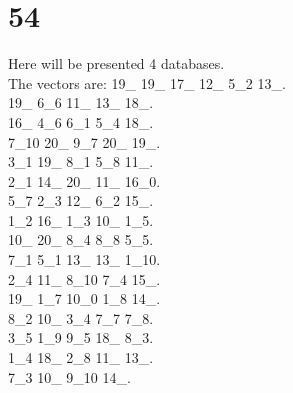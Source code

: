 \chapter{54}
\indent Here will be presented 4 databases.\\
The vectors are:
19\_ 19\_ 17\_ 12\_ 5\_2 13\_.\\19\_ 6\_6 11\_ 13\_ 18\_.\\16\_ 4\_6 6\_1 5\_4 18\_.\\7\_10 20\_ 9\_7 20\_ 19\_.\\3\_1 19\_ 8\_1 5\_8 11\_.\\2\_1 14\_ 20\_ 11\_ 16\_0.\\5\_7 2\_3 12\_ 6\_2 15\_.\\1\_2 16\_ 1\_3 10\_ 1\_5.\\10\_ 20\_ 8\_4 8\_8 5\_5.\\7\_1 5\_1 13\_ 13\_ 1\_10.\\2\_4 11\_ 8\_10 7\_4 15\_.\\19\_ 1\_7 10\_0 1\_8 14\_.\\8\_2 10\_ 3\_4 7\_7 7\_8.\\3\_5 1\_9 9\_5 18\_ 8\_3.\\1\_4 18\_ 2\_8 11\_ 13\_.\\7\_3 10\_ 9\_10 14\_.\\
